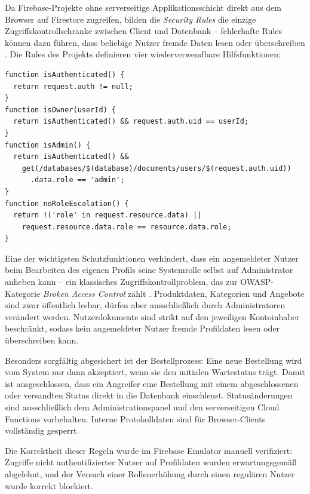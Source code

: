Da Firebase-Projekte ohne serverseitige Applikationsschicht direkt aus dem Browser auf Firestore zugreifen, bilden die \textit{Security Rules} die einzige Zugriffskontrollschranke zwischen Client und Datenbank -- fehlerhafte Rules können dazu führen, dass beliebige Nutzer fremde Daten lesen oder überschreiben \cite{milojkovic2024}. Die Rules des Projekts definieren vier wiederverwendbare Hilfsfunktionen:

\begin{lstlisting}[language={}, morekeywords={function,return,allow,match,if,true,false,write,read,get,create,update,delete,request,resource,auth,data,databases,documents}, caption=Hilfsfunktionen der Firestore Security Rules (firestore.rules)]
function isAuthenticated() {
  return request.auth != null;
}
function isOwner(userId) {
  return isAuthenticated() && request.auth.uid == userId;
}
function isAdmin() {
  return isAuthenticated() &&
    get(/databases/$(database)/documents/users/$(request.auth.uid))
      .data.role == 'admin';
}
function noRoleEscalation() {
  return !('role' in request.resource.data) ||
    request.resource.data.role == resource.data.role;
}
\end{lstlisting}

Eine der wichtigsten Schutzfunktionen verhindert, dass ein angemeldeter Nutzer beim Bearbeiten des eigenen Profils seine Systemrolle selbst auf Administrator anheben kann -- ein klassisches Zugriffskontrollproblem, das zur OWASP-Kategorie \textit{Broken Access Control} zählt \cite{wen2023}. Produktdaten, Kategorien und Angebote sind zwar öffentlich lesbar, dürfen aber ausschließlich durch Administratoren verändert werden. Nutzerdokumente sind strikt auf den jeweiligen Kontoinhaber beschränkt, sodass kein angemeldeter Nutzer fremde Profildaten lesen oder überschreiben kann.

Besonders sorgfältig abgesichert ist der Bestellprozess: Eine neue Bestellung wird vom System nur dann akzeptiert, wenn sie den initialen Wartestatus trägt. Damit ist ausgeschlossen, dass ein Angreifer eine Bestellung mit einem abgeschlossenen oder versandten Status direkt in die Datenbank einschleust. Statusänderungen sind ausschließlich dem Administrationspanel und den serverseitigen Cloud Functions vorbehalten. Interne Protokolldaten sind für Browser-Clients vollständig gesperrt.

Die Korrektheit dieser Regeln wurde im Firebase Emulator manuell verifiziert: Zugriffe nicht authentifizierter Nutzer auf Profildaten wurden erwartungsgemäß abgelehnt, und der Versuch einer Rollenerhöhung durch einen regulären Nutzer wurde korrekt blockiert.
